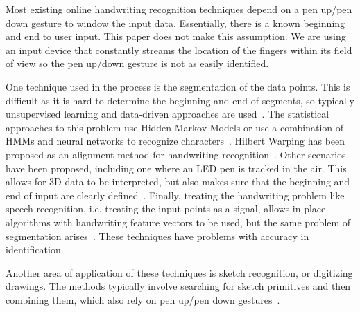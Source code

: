Most existing online handwriting recognition techniques depend on a pen up/pen
down gesture to window the input data. Essentially, there is a known beginning
and end to user input. This paper does not make this assumption. We are using an
input device that constantly streams the location of the fingers within its
field of view so the pen up/down gesture is not as easily identified.   

One
technique used in the process is the segmentation of the data points. This is
difficult as it is hard to determine the beginning and end of segments, so
typically unsupervised learning and data-driven approaches are
used~\cite{plamondon2000online}. The statistical approaches to this problem use
Hidden Markov Models or use a combination of HMMs and neural networks to
recognize characters~\cite{plotz2009markov}. Hilbert Warping has been proposed
as an alignment method for handwriting recognition~\cite{ishida2010hilbert}.
Other scenarios have been proposed, including one where an LED pen is tracked in
the air. This allows for 3D data to be interpreted, but also makes sure that the
beginning and end of input are clearly defined~\cite{asano2010visual}. Finally,
treating the handwriting problem like speech recognition, i.e. treating the
input points as a signal, allows in place algorithms with handwriting feature
vectors to be used, but the same problem of segmentation
arises~\cite{starner1994online}. These techniques have problems with accuracy in
identification.   

Another area of application of these techniques is sketch
recognition, or digitizing drawings. The methods typically involve searching for
sketch primitives and then combining them, which also rely on pen up/pen down
gestures~\cite{hammond2011recognizing}.   